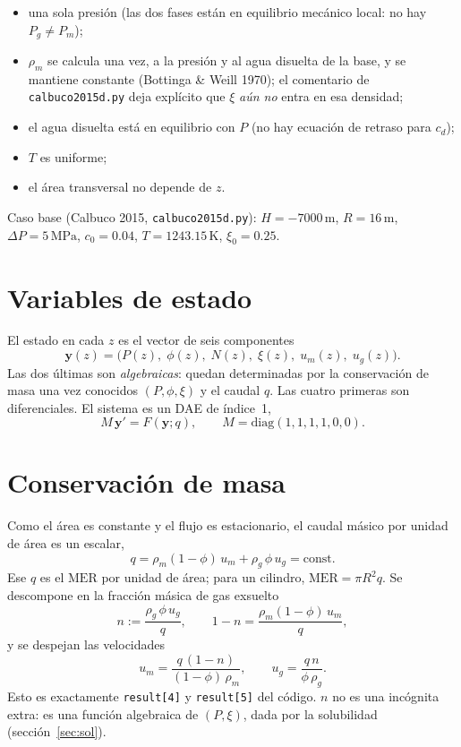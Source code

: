 \documentclass[11pt,a4paper]{article}
\newcommand{\MER}{\mathrm{MER}}
\begin{document}
\begin{itemize}[leftmargin=1.2em,itemsep=0.2em]
\item una sola presión (las dos fases están en equilibrio mecánico
  local: no hay $P_g\neq P_m$);
\item $\rho_m$ se calcula una vez, a la presión y al agua disuelta de
  la base, y se mantiene constante (Bottinga \& Weill 1970); el
  comentario de \texttt{calbuco2015d.py} deja explícito que $\xi$
  \emph{aún no} entra en esa densidad;
\item el agua disuelta está en equilibrio con $P$ (no hay ecuación de
  retraso para $c_d$);
\item $T$ es uniforme;
\item el área transversal no depende de $z$.
\end{itemize}

Caso base (Calbuco 2015, \texttt{calbuco2015d.py}):
$H=-7000\,\mathrm{m}$, $R=16\,\mathrm{m}$,
$\Delta P=5\,\mathrm{MPa}$, $c_0=0.04$, $T=1243.15\,\mathrm{K}$,
$\xi_0=0.25$.

\section{Variables de estado}

El estado en cada $z$ es el vector de seis componentes
\begin{equation}
\label{eq:estado}
\mathbf{y}(z)=\bigl(P(z),\;\phi(z),\;N(z),\;\xi(z),\;u_m(z),\;u_g(z)\bigr).
\end{equation}
Las dos últimas son \emph{algebraicas}: quedan determinadas por la
conservación de masa una vez conocidos $(P,\phi,\xi)$ y el caudal
$q$. Las cuatro primeras son diferenciales. El sistema es un DAE de
índice~1,
\begin{equation}
\label{eq:DAE}
M\,\mathbf{y}'=F(\mathbf{y};q),\qquad
M=\mathrm{diag}(1,1,1,1,0,0).
\end{equation}

\section{Conservación de masa}

Como el área es constante y el flujo es estacionario, el caudal másico
por unidad de área es un escalar,
\begin{equation}
\label{eq:q}
q
=\rho_m(1-\phi)\,u_m
+\rho_g\,\phi\,u_g
=\mathrm{const}.
\end{equation}
Ese $q$ es el $\MER$ por unidad de área; para un cilindro,
$\MER=\pi R^2 q$. Se descompone en la fracción másica de gas exsuelto
\begin{equation}
\label{eq:n}
n
:=\frac{\rho_g\,\phi\,u_g}{q},
\qquad
1-n
=\frac{\rho_m(1-\phi)\,u_m}{q},
\end{equation}
y se despejan las velocidades
\begin{equation}
\label{eq:vel}
u_m
=\frac{q\,(1-n)}{(1-\phi)\,\rho_m},
\qquad
u_g
=\frac{q\,n}{\phi\,\rho_g}.
\end{equation}
Esto es exactamente \texttt{result[4]} y \texttt{result[5]} del
código. $n$ no es una incógnita extra: es una función algebraica de
$(P,\xi)$, dada por la solubilidad (sección~\ref{sec:sol}).
\end{document}

